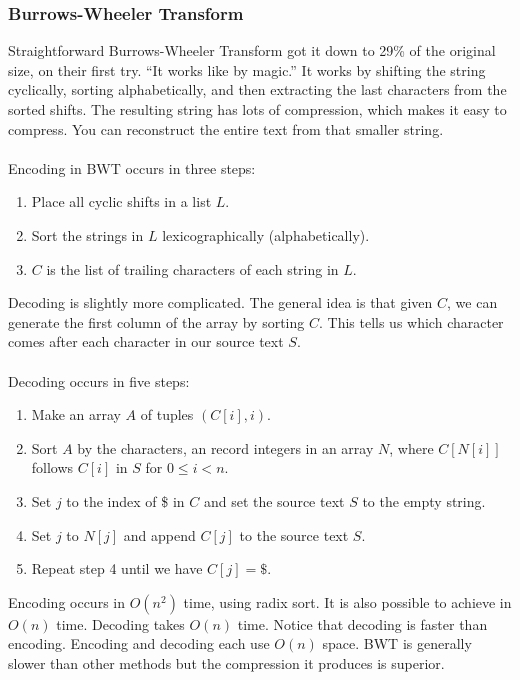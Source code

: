 \documentclass[]{article}
\theoremstyle{definition}
\newcommand{\lecture}[1]{\marginpar{{\footnotesize $\leftarrow$ \underline{#1}}}}
\begin{document}
			\subsubsection{Burrows-Wheeler Transform}
				Straightforward Burrows-Wheeler Transform got it down to 29\% of the original size, on their first try. ``It works like by magic.'' It works by shifting the string cyclically, sorting alphabetically, and then extracting the last characters from the sorted shifts. The resulting string has lots of compression, which makes it easy to compress. You can reconstruct the entire text from that smaller string.
				\\ \\
				Encoding in BWT occurs in three steps: \lecture{April 2, 2013}
					\begin{enumerate}
						\item Place all cyclic shifts in a list $L$.
						\item Sort the strings in $L$ lexicographically (alphabetically).
						\item $C$ is the list of trailing characters of each string in $L$.
					\end{enumerate}
					
				Decoding is slightly more complicated. The general idea is that given $C$, we can generate the first column of the array by sorting $C$. This tells us which character comes after each character in our source text $S$.
				\\ \\
				Decoding occurs in five steps:
				\begin{enumerate}
					\item Make an array $A$ of tuples $(C[i], i)$.
					\item Sort $A$ by the characters, an record integers in an array $N$, where $C[N[i]]$ follows $C[i]$ in $S$ for $0 \le i < n$.
					\item Set $j$ to the index of \$ in $C$ and set the source text $S$ to the empty string.
					\item Set $j$ to $N[j]$ and append $C[j]$ to the source text $S$.
					\item Repeat step 4 until we have $C[j] = \$$.
				\end{enumerate}
				
				Encoding occurs in $O(n^2)$ time, using radix sort. It is also possible to achieve in $O(n)$ time. Decoding takes $O(n)$ time. Notice that decoding is faster than encoding. Encoding and decoding each use $O(n)$ space. BWT is generally slower than other methods but the compression it produces is superior.
			
\end{document}
